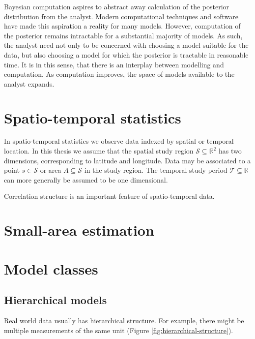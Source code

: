 \documentclass[a4paper, nobind]{templates/ociamthesis}
\begin{document}
Bayesian computation aspires to abstract away calculation of the posterior distribution from the analyst.
Modern computational techniques and software have made this aspiration a reality for many models.
However, computation of the posterior remains intractable for a substantial majority of models.
As such, the analyst need not only to be concerned with choosing a model suitable for the data, but also choosing a model for which the posterior is tractable in reasonable time.
It is in this sense, that there is an interplay between modelling and computation.
As computation improves, the space of models available to the analyst expands.

\hypertarget{spatio-temporal-statistics}{%
\section{Spatio-temporal statistics}\label{spatio-temporal-statistics}}

In spatio-temporal statistics \autocite{cressie2015statistics} we observe data indexed by spatial or temporal location.
In this thesis we assume that the spatial study region \(\mathcal{S} \subseteq \mathbb{R}^2\) has two dimensions, corresponding to latitude and longitude.
Data may be associated to a point \(s \in \mathcal{S}\) or area \(A \subseteq \mathcal{S}\) in the study region.
The temporal study period \(\mathcal{T} \subseteq \mathbb{R}\) can more generally be assumed to be one dimensional.

Correlation structure is an important feature of spatio-temporal data.

\hypertarget{small-area-estimation}{%
\section{Small-area estimation}\label{small-area-estimation}}

\hypertarget{hierarchical-lgm-elgm}{%
\section{Model classes}\label{hierarchical-lgm-elgm}}

\hypertarget{hierarchical}{%
\subsection{Hierarchical models}\label{hierarchical}}

Real world data usually has hierarchical structure.
For example, there might be multiple measurements of the same unit (Figure \ref{fig:hierarchical-structure}).
\end{document}
